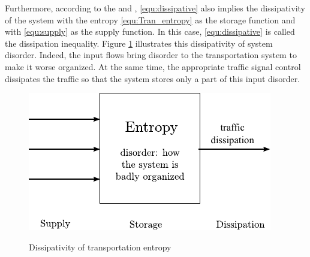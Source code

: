\documentclass[trsc,nonblindrev]{informs3} %
\begin{document}
Furthermore, according to the \citet{willems_dissipative_1972} and
\citet{hill_dissipative_1980}, \eqref{equ:dissipative} also implies
the dissipativity of the system with the entropy \eqref{equ:Tran_entropy} as the
storage function and with \eqref{equ:supply} as the supply function.
In this case, \eqref{equ:dissipative} is called the dissipation  
inequality. Figure \ref{fig:trans_dis} illustrates this dissipativity
of system disorder. Indeed, the input flows bring disorder to the
transportation system to make it worse organized. At the same time,
the appropriate traffic signal control dissipates the traffic so that
the system stores only a part of this input disorder.
\begin{figure}[ht]
  \centering
  \includegraphics{pics/trans_dis}\\
  \caption{Dissipativity of transportation entropy}
  \label{fig:trans_dis}
\end{figure}
\end{document}
